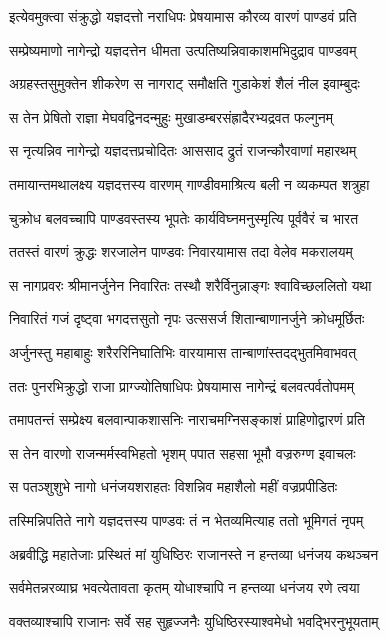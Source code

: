 \twolineshloka
{इत्येवमुक्त्वा संक्रुद्धो यज्ञदत्तो नराधिपः}
{प्रेषयामास कौरव्य वारणं पाण्डवं प्रति}


\twolineshloka
{सम्प्रेष्यमाणो नागेन्द्रो यज्ञदत्तेन धीमता}
{उत्पतिष्यन्निवाकाशमभिदुद्राव पाण्डवम्}


\twolineshloka
{अग्रहस्तसुमुक्तेन शीकरेण स नागराट्}
{समौक्षति गुडाकेशं शैलं नील इवाम्बुदः}


\twolineshloka
{स तेन प्रेषितो राज्ञा मेघवद्विनदन्मुहुः}
{मुखाडम्बरसंह्रादैरभ्यद्रवत फल्गुनम्}


\twolineshloka
{स नृत्यन्निव नागेन्द्रो यज्ञदत्तप्रचोदितः}
{आससाद द्रुतं राजन्कौरवाणां महारथम्}


\twolineshloka
{तमायान्तमथालक्ष्य यज्ञदत्तस्य वारणम्}
{गाण्डीवमाश्रित्य बली न व्यकम्पत शत्रुहा}


\twolineshloka
{चुक्रोध बलवच्चापि पाण्डवस्तस्य भूपतेः}
{कार्यविघ्नमनुस्मृत्यि पूर्ववैरं च भारत}


\twolineshloka
{ततस्तं वारणं क्रुद्धः शरजालेन पाण्डवः}
{निवारयामास तदा वेलेव मकरालयम्}


\twolineshloka
{स नागप्रवरः श्रीमानर्जुनेन निवारितः}
{तस्थौ शरैर्विनुन्नाङ्गः श्वाविच्छललितो यथा}


\twolineshloka
{निवारितं गजं दृष्ट्वा भगदत्तसुतो नृपः}
{उत्ससर्ज शितान्बाणानर्जुने क्रोधमूर्छितः}


\twolineshloka
{अर्जुनस्तु महाबाहुः शरैररिनिघातिभिः}
{वारयामास तान्बाणांस्तदद्भुतमिवाभवत्}


\twolineshloka
{ततः पुनरभिक्रुद्धो राजा प्राग्ज्योतिषाधिपः}
{प्रेषयामास नागेन्द्रं बलवत्पर्वतोपमम्}


\twolineshloka
{तमापतन्तं सम्प्रेक्ष्य बलवान्पाकशासनिः}
{नाराचमग्निसङ्काशं प्राहिणोद्वारणं प्रति}


\twolineshloka
{स तेन वारणो राजन्मर्मस्वभिहतो भृशम्}
{पपात सहसा भूमौ वज्ररुग्ण इवाचलः}


\twolineshloka
{स पतञ्शुशुभे नागो धनंजयशराहतः}
{विशन्निव महाशैलो महीं वज्रप्रपीडितः}


\twolineshloka
{तस्मिन्निपतिते नागे यज्ञदत्तस्य पाण्डवः}
{तं न भेतव्यमित्याह ततो भूमिगतं नृपम्}


\twolineshloka
{अब्रवीद्धि महातेजाः प्रस्थितं मां युधिष्ठिरः}
{राजानस्ते न हन्तव्या धनंजय कथञ्चन}


\twolineshloka
{सर्वमेतन्नरव्याघ्र भवत्येतावता कृतम्}
{योधाश्चापि न हन्तव्या धनंजय रणे त्वया}


\twolineshloka
{वक्तव्याश्चापि राजानः सर्वे सह सुहृज्जनैः}
{युधिष्ठिरस्याश्वमेधो भवद्भिरनुभूयताम्}


